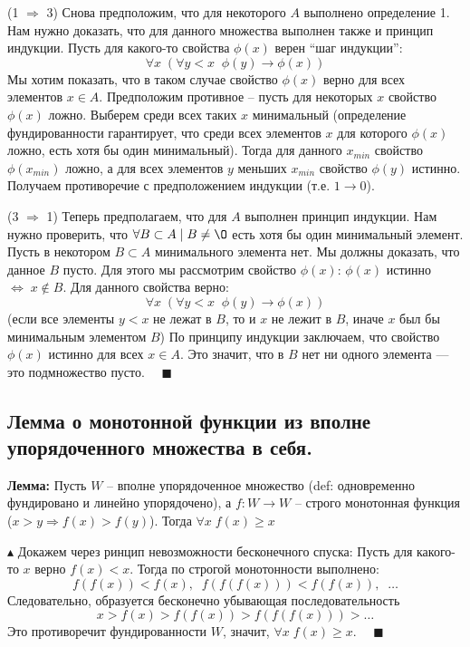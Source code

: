 \par (1 $\Rightarrow$ 3) Снова предположим, что для
некоторого $A$ выполнено определение 1. Нам нужно доказать, что для данного множества выполнен также и принцип индукции. Пусть для какого-то свойства $\phi(x)$ верен “шаг индукции”: $$\forall x \; (\forall y<x \;\; \phi(y)\to \phi(x) )$$
Мы хотим показать, что в таком случае свойство $\phi(x)$ верно для всех элементов $x \in A$. Предположим противное – пусть для некоторых $x$ свойство $\phi(x)$ ложно. Выберем среди всех таких $x$ минимальный (определение фундированности гарантирует, что среди всех элементов $x$ для которого $\phi(x)$ ложно, есть хотя бы один минимальный). Тогда для данного $x_{min}$ свойство $\phi(x_{min})$ ложно, а для всех элементов $y$ меньших $x_{min}$ свойство $\phi(y)$ истинно. Получаем противоречие с предположением индукции (т.е. $1\to 0$).

\par (3 $\Rightarrow$ 1) Теперь предполагаем, что для
$A$ выполнен принцип индукции. Нам нужно проверить, что $\forall B\subset A \; | \; B\neq \O$ есть хотя бы один минимальный элемент. Пусть в некотором $B\subset A$ минимального элемента нет. Мы должны доказать, что данное $B$ пусто. Для этого мы рассмотрим свойство $\phi(x)$\;: $\phi(x)$ истинно $\Leftrightarrow \; x\notin B$. Для данного свойства верно: $$\forall x \; (\forall y<x \;\; \phi(y)\to \phi(x) )$$ 
(если все элементы $y<x$ не лежат в $B$, то и $x$ не лежит в $B$, иначе $x$ был бы минимальным элементом $B$) По принципу индукции заключаем, что свойство $\phi(x)$ истинно для всех $x\in A$. Это значит, что в $B$ нет ни одного
элемента — это подмножество пусто. $\quad \blacksquare$

\subsection{Лемма о монотонной функции из вполне упорядоченного множества в себя.}

\textbf{Лемма:} Пусть $W$ -- вполне упорядоченное множество (def: одновременно фундировано и линейно упорядочено), а $f:W\to W$ -- строго монотонная функция ($x>y \Rightarrow f(x)>f(y)$). \newline Тогда $\forall x \; f(x)\geqslant x$

$\blacktriangle$ Докажем через ринцип невозможности бесконечного спуска:
\newline Пусть для какого-то $x$ верно $f(x)<x$. Тогда по строгой монотонности выполнено: $$f(f(x))<f(x),\;\; f(f(f(x)))<f(f(x)),\;\; \ldots$$ Следовательно, образуется бесконечно убывающая последовательность $$x>f(x)>f(f(x))>f(f(f(x)))>\ldots$$ Это противоречит фундированности $W$, значит, $\forall x \; f(x)\geqslant x$. $\quad \blacksquare$
